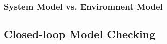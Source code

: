 \documentclass{llncs}
\begin{document}
\subsubsection{System Model vs. Environment Model}
\subsection{Closed-loop Model Checking}
%
%
\end{document}
